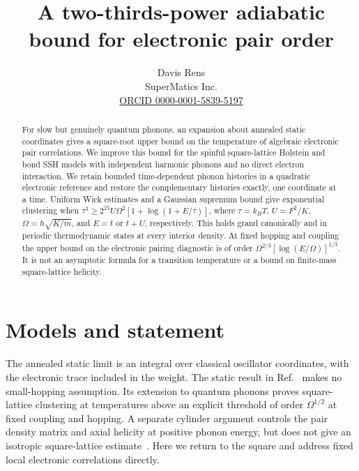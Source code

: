 \documentclass[11pt]{article}
\title{A two-thirds-power adiabatic bound for electronic pair order}
\author{Davis Rens\\SuperMatics Inc.\\\href{https://orcid.org/0000-0001-5839-5197}{ORCID 0000-0001-5839-5197}}
\date{}
\begin{document}
\maketitle
\begin{abstract}
For slow but genuinely quantum phonons, an expansion about annealed static coordinates gives a square-root upper bound on the temperature of algebraic electronic pair correlations. We improve this bound for the spinful square-lattice Holstein and bond SSH models with independent harmonic phonons and no direct electron interaction. We retain bounded time-dependent phonon histories in a quadratic electronic reference and restore the complementary histories exactly, one coordinate at a time. Uniform Wick estimates and a Gaussian supremum bound give exponential clustering when $\tau^3\ge 2^{25}U\Omega^2[1+\log(1+E/\tau)]$, where $\tau=k_BT$, $U=F^2/K$, $\Omega=\hbar\sqrt{K/m}$, and $E=t$ or $t+U$, respectively. This holds grand canonically and in periodic thermodynamic states at every interior density. At fixed hopping and coupling the upper bound on the electronic pairing diagnostic is of order $\Omega^{2/3}[\log(E/\Omega)]^{1/3}$. It is not an asymptotic formula for a transition temperature or a bound on finite-mass square-lattice helicity.
\end{abstract}

\section{Models and statement}
The annealed static limit is an integral over classical oscillator coordinates, with the electronic trace included in the weight. The static result in Ref.~\cite{slow} makes no small-hopping assumption. Its extension to quantum phonons proves square-lattice clustering at temperatures above an explicit threshold of order $\Omega^{1/2}$ at fixed coupling and hopping. A separate cylinder argument controls the pair density matrix and axial helicity at positive phonon energy, but does not give an isotropic square-lattice estimate~\cite{cylinders}. Here we return to the square and address fixed local electronic correlations directly.
\end{document}
